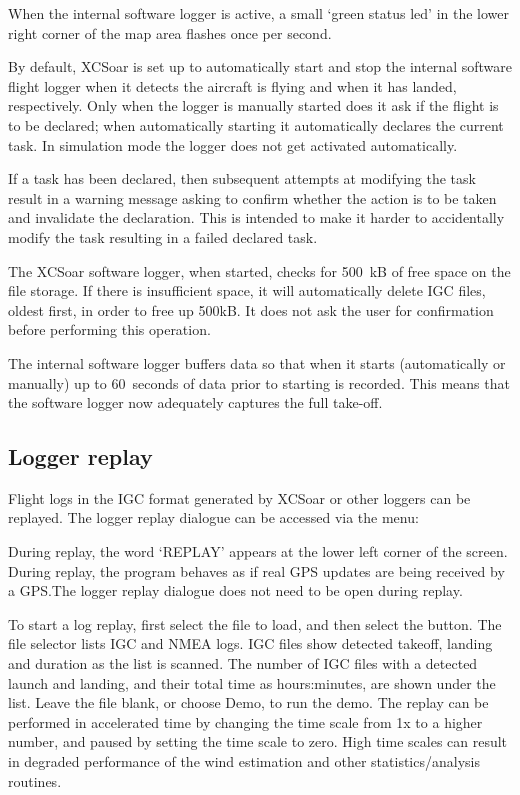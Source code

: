 When the internal software logger is active, a small `green status led' in the
lower right corner of the map area flashes once per second.

By default, XCSoar is set up to automatically start and stop the
internal software flight logger when it detects the aircraft is flying
and when it has landed, respectively.  Only when the logger is
manually started does it ask if the flight is to be declared; when
automatically starting it automatically declares the current task.
In simulation mode the logger does not get activated automatically.

If a task has been declared, then subsequent attempts at modifying the
task result in a warning message asking to confirm whether the action
is to be taken and invalidate the declaration.  This is intended to
make it harder to accidentally modify the task resulting in a failed
declared task.

The XCSoar software logger, when started, checks for 500~kB of free
space on the file storage.  If there is insufficient space, it will
automatically delete IGC files, oldest first, in order to free up
500kB.  It does not ask the user for confirmation before performing
this operation. \warning{}

The internal software logger buffers data so that when it starts
(automatically or manually) up to 60~seconds of data prior to starting
is recorded.  This means that the software logger now adequately
captures the full take-off.

\subsection*{Logger replay}\label{sec:logger-replay}
Flight logs in the IGC format generated by XCSoar or other loggers can
be replayed.  The logger replay dialogue can be accessed via the
menu:
\begin{quote}
\blink{}
\end{quote}

During replay, the word `REPLAY' appears at the lower left corner of
the screen.  During replay, the program behaves as if real GPS updates
are being received by a GPS.\@  The logger replay dialogue does not need
to be open during replay.

To start a log replay, first select the file to load, and then select the
 button.  The file selector lists IGC and NMEA logs.  IGC
files show detected takeoff, landing and duration as the list is scanned.
The number of IGC files with a detected launch and landing, and their
total time as hours:minutes, are shown under the list.
Leave the file blank, or choose Demo, to run the demo.  The replay can be
performed in accelerated time
by changing the time scale from 1x to a higher number, and paused by
setting the time scale to zero.  High time scales can result in degraded
performance of the wind estimation and other statistics/analysis routines.

